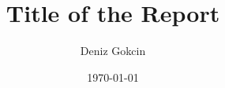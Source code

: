 \newcommand{\mytitle}{Title of the Report}
\newcommand{\myauthor}{Deniz Gokcin}

\title{\mytitle}
\author{\myauthor}
\date{\today}

